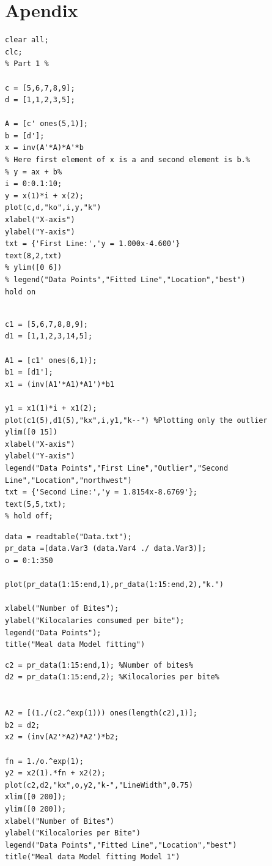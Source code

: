 \documentclass{article}
\begin{document}
\section{\centering Apendix}\label{sec:apdx}
\begin{lstlisting}[frame=single]
clear all;
clc;
% Part 1 %

c = [5,6,7,8,9];
d = [1,1,2,3,5];

A = [c' ones(5,1)];
b = [d'];
x = inv(A'*A)*A'*b
% Here first element of x is a and second element is b.%
% y = ax + b%
i = 0:0.1:10;
y = x(1)*i + x(2);
plot(c,d,"ko",i,y,"k")
xlabel("X-axis")
ylabel("Y-axis")
txt = {'First Line:','y = 1.000x-4.600'}
text(8,2,txt)
% ylim([0 6])
% legend("Data Points","Fitted Line","Location","best")
hold on
\end{lstlisting}

\begin{lstlisting}[frame=single]
% Part 2 

c1 = [5,6,7,8,8,9];
d1 = [1,1,2,3,14,5];

A1 = [c1' ones(6,1)];
b1 = [d1'];
x1 = (inv(A1'*A1)*A1')*b1

y1 = x1(1)*i + x1(2);
plot(c1(5),d1(5),"kx",i,y1,"k--") %Plotting only the outlier
ylim([0 15])
xlabel("X-axis")
ylabel("Y-axis")
legend("Data Points","First Line","Outlier","Second Line","Location","northwest")
txt = {'Second Line:','y = 1.8154x-8.6769'};
text(5,5,txt);
% hold off;
\end{lstlisting}

\begin{lstlisting}[frame=single]
% Part 3 %
data = readtable("Data.txt");
pr_data =[data.Var3 (data.Var4 ./ data.Var3)];
o = 0:1:350

plot(pr_data(1:15:end,1),pr_data(1:15:end,2),"k.")

xlabel("Number of Bites");
ylabel("Kilocalaries consumed per bite");
legend("Data Points");
title("Meal data Model fitting")
\end{lstlisting}

\begin{lstlisting}[frame=single]
%First Model%
c2 = pr_data(1:15:end,1); %Number of bites%
d2 = pr_data(1:15:end,2); %Kilocalories per bite%


A2 = [(1./(c2.^exp(1))) ones(length(c2),1)];
b2 = d2;
x2 = (inv(A2'*A2)*A2')*b2;

fn = 1./o.^exp(1);
y2 = x2(1).*fn + x2(2);
plot(c2,d2,"kx",o,y2,"k-","LineWidth",0.75)
xlim([0 200]);
ylim([0 200]);
xlabel("Number of Bites")
ylabel("Kilocalories per Bite")
legend("Data Points","Fitted Line","Location","best")
title("Meal data Model fitting Model 1")
\end{lstlisting}
\end{document}
